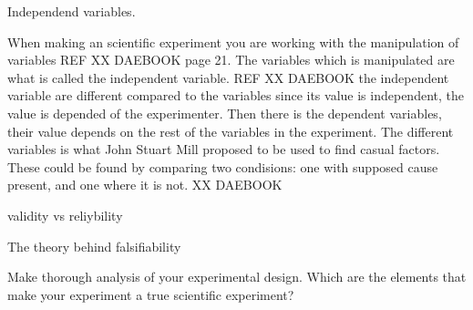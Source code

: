 Independend variables. 

When making an scientific experiment you are working with the manipulation of variables REF XX DAEBOOK page 21. The variables which is manipulated are what is called the independent variable. REF XX DAEBOOK the independent variable are different compared to the variables since its value is independent, the value is depended of the experimenter.
Then there is the dependent variables, their value depends on the rest of the variables in the experiment. The different variables is what John Stuart Mill proposed to be used to find casual factors. These could be found by comparing two condisions: one with supposed cause present, and one where it is not. XX DAEBOOK


validity vs reliybility

The theory behind falsifiability 


Make thorough analysis of your experimental design. Which are the elements that make your experiment a true scientific experiment?